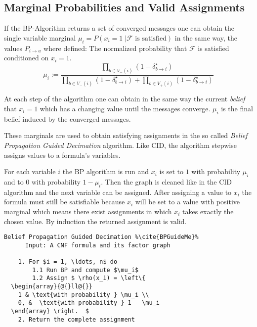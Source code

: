 \subsection{Marginal Probabilities and Valid Assignments}

If the BP-Algorithm returns a set of converged messages one can obtain the single variable marginal $\mu_i = P(x_i = 1 \; | \mathcal{F} \text{ is satisfied})$ in the same way, the values $P_{i \rightarrow a}$ where defined: The normalized probability that $\mathcal{F}$ is satisfied conditioned on $x_i = 1$.
$$ \mu_i := \frac{\prod_{b \in V_-(i)} (1 - \delta^\star_{b \rightarrow i})}{\prod_{b \in V_-(i)} (1 - \delta^\star_{b \rightarrow i}) + \prod_{b \in V_+(i)} (1 - \delta^\star_{b \rightarrow i})}$$

At each step of the algorithm one can obtain in the same way the current \emph{belief} that $x_i = 1$ which has a changing value until the messages converge. $\mu_i$ is the final belief induced by the converged messages. \newline

These marginals are used to obtain satisfying assignments in the so called \emph{Belief Propagation Guided Decimation} algorithm. Like CID, the algorithm stepwise assigns  values to a formula's variables.

For each variable $i$ the BP algorithm is run and $x_i$ is set to $1$ with probability $\mu_i$ and to $0$ with probability $1 - \mu_i$. Then the graph is cleaned like in the CID algorithm and the next variable can be assigned. After assigning a value to $x_i$ the formula must still be satisfiable because $x_i$ will be set to a value with positive marginal which means there exist assignments in which $x_i$ takes exactly the chosen value. By induction the returned assignment is valid.

\begin{lstlisting}[mathescape=true, frame = single, escapechar=\%]
	Belief Propagation Guided Decimation %\cite{BPGuideMe}%
	  Input: A CNF formula and its factor graph
	  
	1. For $i = 1, \ldots, n$ do
		1.1 Run BP and compute $\mu_i$
		1.2 Assign $ \rho(x_i) = \left\{
  \begin{array}{@{}ll@{}}
    1 & \text{with probability } \mu_i \\
    0, &  \text{with probability } 1 - \mu_i 
  \end{array} \right.  $
	2. Return the complete assignment
\end{lstlisting}

